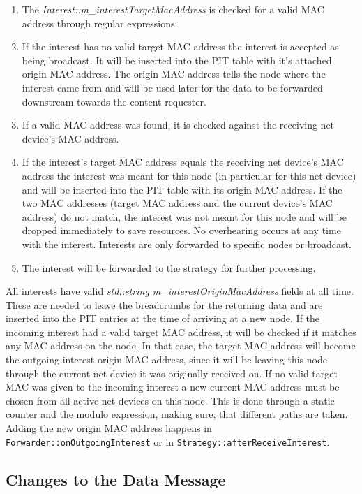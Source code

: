 \begin{enumerate}
\item The \emph{Interest::m\_interestTargetMacAddress} is checked for a valid MAC address through regular expressions.
\item If the interest has no valid target MAC address the interest is accepted as being broadcast. It will be inserted into the PIT table with it's attached origin MAC address. The origin MAC address tells the node where the interest came from and will be used later for the data to be forwarded downstream towards the content requester.
\item If a valid MAC address was found, it is checked against the receiving net device's MAC address.
\item If the interest's target MAC address equals the receiving net device's MAC address the interest was meant for this node (in particular for this net device) and will be inserted into the PIT table with its origin MAC address. If the two MAC addresses (target MAC address and the current device's MAC address) do not match, the interest was not meant for this node and will be dropped immediately to save resources. No overhearing occurs at any time with the interest. Interests are only forwarded to specific nodes or broadcast.
\item The interest will be forwarded to the strategy for further processing.
\end{enumerate}

All interests have valid \emph{std::string m\_interestOriginMacAddress} fields at all time. These are needed to leave the breadcrumbs for the returning data and are inserted into the PIT entries at the time of arriving at a new node. If the incoming interest had a valid target MAC address, it will be checked if it matches any MAC address on the node. In that case, the target MAC address will become the outgoing interest origin MAC address, since it will be leaving this node through the current net device it was originally received on. If no valid target MAC was given to the incoming interest a new current MAC address must be chosen from all active net devices on this node. This is done through a static counter and the modulo expression, making sure, that different paths are taken. Adding the new origin MAC address happens in \texttt{Forwarder::onOutgoingInterest} or in \texttt{Strategy::afterReceiveInterest}.

\subsection{Changes to the Data Message}

